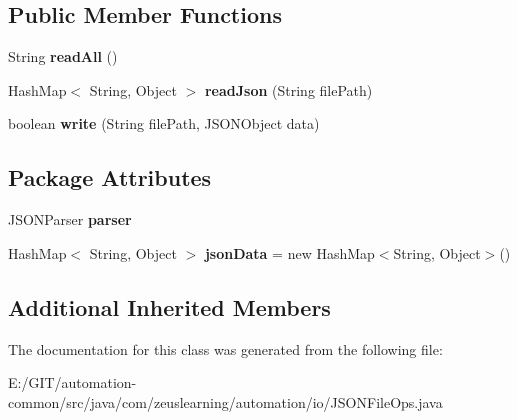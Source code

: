 \subsection*{Public Member Functions}
\begin{DoxyCompactItemize}
\item 
\hypertarget{classcom_1_1zeuslearning_1_1automation_1_1io_1_1JSONFileOps_a8da7f1613a5d285ba01219edc4f5c39b}{}\label{classcom_1_1zeuslearning_1_1automation_1_1io_1_1JSONFileOps_a8da7f1613a5d285ba01219edc4f5c39b} 
String {\bfseries read\+All} ()
\item 
\hypertarget{classcom_1_1zeuslearning_1_1automation_1_1io_1_1JSONFileOps_ab2121814d3811dca5221332b42c7aaba}{}\label{classcom_1_1zeuslearning_1_1automation_1_1io_1_1JSONFileOps_ab2121814d3811dca5221332b42c7aaba} 
Hash\+Map$<$ String, Object $>$ {\bfseries read\+Json} (String file\+Path)
\item 
\hypertarget{classcom_1_1zeuslearning_1_1automation_1_1io_1_1JSONFileOps_a12d8d9326934a8a5f9d4b3657625f91f}{}\label{classcom_1_1zeuslearning_1_1automation_1_1io_1_1JSONFileOps_a12d8d9326934a8a5f9d4b3657625f91f} 
boolean {\bfseries write} (String file\+Path, J\+S\+O\+N\+Object data)
\end{DoxyCompactItemize}
\subsection*{Package Attributes}
\begin{DoxyCompactItemize}
\item 
\hypertarget{classcom_1_1zeuslearning_1_1automation_1_1io_1_1JSONFileOps_ac129a577b12be1a386e1a6f589a0ae3f}{}\label{classcom_1_1zeuslearning_1_1automation_1_1io_1_1JSONFileOps_ac129a577b12be1a386e1a6f589a0ae3f} 
J\+S\+O\+N\+Parser {\bfseries parser}
\item 
\hypertarget{classcom_1_1zeuslearning_1_1automation_1_1io_1_1JSONFileOps_a0e15e5fb7f02174a8b00d9874df599cf}{}\label{classcom_1_1zeuslearning_1_1automation_1_1io_1_1JSONFileOps_a0e15e5fb7f02174a8b00d9874df599cf} 
Hash\+Map$<$ String, Object $>$ {\bfseries json\+Data} = new Hash\+Map$<$String, Object$>$()
\end{DoxyCompactItemize}
\subsection*{Additional Inherited Members}


The documentation for this class was generated from the following file\+:\begin{DoxyCompactItemize}
\item 
E\+:/\+G\+I\+T/automation-\/common/src/java/com/zeuslearning/automation/io/J\+S\+O\+N\+File\+Ops.\+java\end{DoxyCompactItemize}
